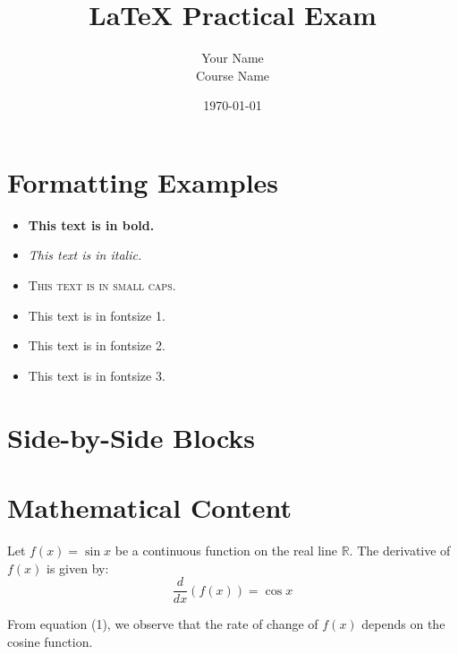 \documentclass[11pt,a5paper]{article}
\title{LaTeX Practical Exam}
\author{Your Name \\ Course Name}
\date{\today}
\begin{document}
\maketitle

\section*{Formatting Examples}

\begin{itemize}
    \item \textbf{This text is in bold.}
    \item \textit{This text is in italic.}
    \item \textsc{This text is in small caps.}
    \item {\fontsize{10}{12}\selectfont This text is in fontsize 1.}
    \item {\fontsize{12}{14}\selectfont This text is in fontsize 2.}
    \item {\fontsize{14}{16}\selectfont This text is in fontsize 3.}
\end{itemize}

\section*{Side-by-Side Blocks}

\noindent
\begin{minipage}{0.45\textwidth}
\blindtext
\end{minipage}
\hfill
\begin{minipage}{0.45\textwidth}
\blindtext
\end{minipage}

\section*{Mathematical Content}

Let $f(x) = \sin x$ be a continuous function on the real line $\mathbb{R}$.  
The derivative of $f(x)$ is given by:
\begin{equation}
\frac{d}{dx}(f(x)) = \cos x
\end{equation}

From equation (1), we observe that the rate of change of $f(x)$ depends on the cosine function.
\end{document}
